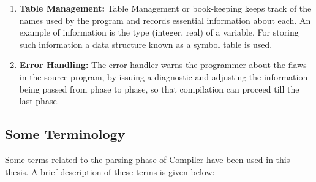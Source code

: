 \begin{enumerate}
\item \textbf{Table Management:} Table Management or book-keeping keeps track of the names used by the program and records essential information about each. An example of information is the type (integer, real) of a variable. For storing such information a data structure known as a symbol table is used.

\item \textbf{Error Handling:} The error handler warns the programmer about the flaws in the source program, by issuing a diagnostic and adjusting the information being passed from phase to phase, so that compilation can proceed till the last phase.
\end{enumerate}

\subsection{Some Terminology}
\label{subsec:Terminology}
Some terms related to the parsing phase of Compiler have been used in this thesis. A brief description of these terms is given below:
